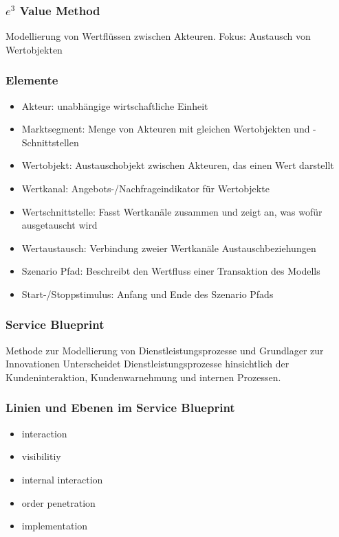 \documentclass[a4paper]{article}
\begin{document}
			\hrulefill
			
			\pagebreak
			
			\subsubsection{ \textnormal{$e^3$} Value Method} %
			Modellierung von Wertflüssen zwischen Akteuren. Fokus: Austausch von Wertobjekten
			
			\subsubsection{Elemente}
			\begin{itemize}
				\item Akteur: unabhängige wirtschaftliche Einheit 
				\item Marktsegment: Menge von Akteuren mit gleichen Wertobjekten und -Schnittstellen 
				\item Wertobjekt: Austauschobjekt zwischen Akteuren, das einen Wert darstellt 
				\item Wertkanal: Angebots-/Nachfrageindikator für Wertobjekte 
				\item Wertschnittstelle: Fasst Wertkanäle zusammen und zeigt an, was wofür ausgetauscht wird 
				\item Wertaustausch: Verbindung zweier Wertkanäle Austauschbeziehungen 
				\item Szenario Pfad: Beschreibt den Wertfluss einer Transaktion des Modells 
				\item Start-/Stoppstimulus: Anfang und Ende des Szenario Pfads
			\end{itemize}
			
			\hrulefill
			
			\subsubsection{Service Blueprint}
			Methode zur Modellierung von Dienstleistungsprozesse und Grundlager zur Innovationen Unterscheidet Dienstleistungsprozesse hinsichtlich der Kundeninteraktion, Kundenwarnehmung und internen Prozessen.
			
			\subsubsection{Linien und Ebenen im Service Blueprint}
			\begin{itemize}
				\item interaction 
				\item visibilitiy 
				\item internal interaction 
				\item order penetration 
				\item implementation
			\end{itemize}
			
\end{document}
